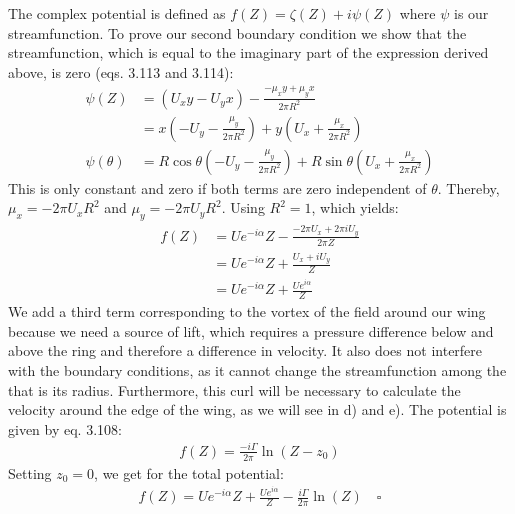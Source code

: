 \documentclass{article}
\begin{document}
The complex potential is defined as $f(Z) = \zeta(Z) + i \psi(Z)$ where $\psi$ is our streamfunction. To prove our second boundary condition we show that the streamfunction, which is equal to the imaginary part of the expression derived above, is zero (eqs. 3.113 and 3.114):
\begin{align*}
    \psi(Z) &= (U_xy - U_yx) - \frac{-\mu_xy + \mu_yx}{2\pi R^2} \\
    &= x(-U_y - \frac{\mu_y}{2\pi R^2}) + y(U_x + \frac{\mu_x}{2\pi R^2}) \\
    \psi(\theta) &= R\cos{\theta}(-U_y - \frac{\mu_y}{2\pi R^2}) + R\sin{\theta}(U_x + \frac{\mu_x}{2\pi R^2})
\end{align*}
This is only constant and zero if both terms are zero independent of $\theta$. Thereby, $\mu_x = -2\pi U_x R^2$ and $\mu_y = -2\pi U_y R^2$. Using $R^2 = 1$, which yields:
\begin{align*}
    f(Z) &= Ue^{-i\alpha}Z - \frac{-2\pi U_x+2\pi iU_y}{2\pi Z}\\
    &=Ue^{-i\alpha}Z+\frac{U_x+iU_y}{Z}\\
    &=Ue^{-i\alpha}Z+\frac{Ue^{i\alpha}}{Z}
\end{align*}
We add a third term corresponding to the vortex of the field around our wing because we need a source of lift, which requires a pressure difference below and above the ring and therefore a difference in velocity. It also does not interfere with the boundary conditions, as it cannot change the streamfunction among the that is its radius.  Furthermore, this curl will be necessary to calculate the velocity around the edge of the wing, as we will see in d) and e). The potential is given by eq. 3.108: 
\begin{align*}
    f(Z)=\frac{-i \Gamma }{2\pi}\ln (Z-z_0)
\end{align*}
Setting $z_0=0$, we get for the total potential: 
\begin{align*}
    f(Z) = U e^{-i\alpha} Z + \frac{U e^{i\alpha}}{Z}
- \frac{i\Gamma}{2\pi} \ln(Z) \quad \square 
\end{align*}
\end{document}

